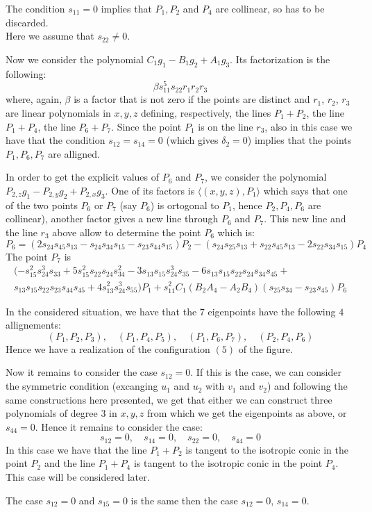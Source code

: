 \documentclass{amsart}
\theoremstyle{plain}
\theoremstyle{definition}
\newcommand{\scl}[2]{\langle #1, #2 \rangle}
\begin{document}
The condition $s_{11} = 0$ implies that $P_1, P_2$ and $P_4$ are collinear,
so has to be discarded. \\
Here we assume that $s_{22} \not =  0$. 

Now we consider the polynomial $C_1g_1-B_1g_2+A_1g_3$. Its factorization is the
following:
\[
\beta s_{11}^5 s_{22} r_1 r_2 r_3
\]
where, again, $\beta$ is a factor that is not zero if the points are
distinct and $r_1$, $r_2$, $r_3$ are linear polynomials in $x, y, z$
defining, respectively, the lines $P_1+P_2$, the line $P_1+P_4$, the line
$P_6+P_7$. Since the point $P_1$ is on the line $r_3$,
also in this case we have that the condition $s_{12} = s_{14} = 0$
(which gives $\delta_2=0$) implies that the points $P_1, P_6, P_7$ are
alligned.

In order to get the explicit values of $P_6$ and $P_7$, we consider the
polynomial $P_{2,z}g_1-P_{2, y}g_2+P_{2,x}g_3$. One of its factors is
$\scl{(x, y, z)}{P_1}$ which says that one of the two points $P_6$ or
$P_7$ (say $P_6$) is ortogonal to $P_1$, hence $P_2, P_4, P_6$ are collinear),
another factor gives a new
line through $P_6$ and $P_7$. This new line and the line $r_3$ above
allow to determine the point $P_6$ which is:
\[
P_6 = (2s_{24}s_{45}s_{13} - s_{24}s_{34}s_{15} - s_{23}s_{44}s_{15})P_2 - 
(s_{24}s_{25}s_{13} + s_{22}s_{45}s_{13} - 2s_{22}s_{34}s_{15})P_4
\]
The point $P_7$ is
\[
\begin{array}{l}
  (-s_{15}^2s_{24}^3s_{33} + 5s_{15}^2s_{22}s_{24}s_{34}^2 
  - 3s_{13}s_{15}s_{24}^3s_{35} - 6s_{13}s_{15}s_{22}s_{24}s_{34}s_{45} +\\
  s_{13}s_{15}s_{22}s_{23}s_{44}s_{45} + 4s_{13}^2s_{24}^3s_{55})P_1+
  s_{11}^2C_1(B_2A_4 - A_2B_4)(s_{25}s_{34} - s_{23}s_{45})P_6
  \end{array}
   \]

   In the considered situation, we have that the $7$ eigenpoints have
   the following $4$ allignements:
   \[
   (P_1, P_2, P_3), \quad (P_1, P_4, P_5), \quad (P_1, P_6, P_7),
   \quad (P_2, P_4, P_6)
   \]
   Hence we have a realization of the configuration $(5)$ of the figure.

   Now it remains to consider the case $s_{12} = 0$. If this is the case,
   we can consider the symmetric condition (excanging $u_1$ and $u_2$
   with $v_1$ and $v_2$) and following the same constructions here
   presented, we get that either we can construct three polynomials of
   degree $3$ in $x, y, z$ from which we get the eigenpoints as above,
   or $s_{44} = 0$. Hence it remains to consider the case:
   \[
   s_{12} = 0, \quad s_{14} = 0, \quad s_{22} = 0, \quad s_{44} = 0
   \]
   In this case we have that the line $P_1+P_2$ is tangent to the
   isotropic conic in the point $P_2$ and the line $P_1+P_4$ is tangent
   to the isotropic conic in the point $P_4$. This case will be considered
   later.

   The case $s_{12}= 0$ and $s_{15}=0$ is the same then the case
   $s_{12} = 0$, $s_{14} = 0$.

   
\end{document}
